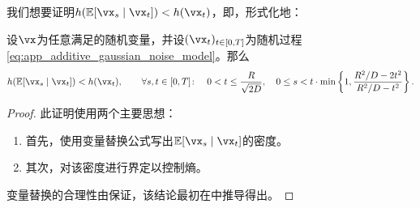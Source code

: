 \documentclass[../../book-main.tex]{subfiles}
\begin{document}
我们想要证明\(h(\Ex[\vx_{s} \mid \vx_{t}]) < h(\vx_{t})\)，即，形式化地：
\begin{theorem}\label{thm:conditioning_reduces_entropy}
    设\(\vx\)为任意满足的随机变量，并设\((\vx_{t})_{t \in [0, T]}\)为随机过程\eqref{eq:app_additive_gaussian_noise_model}。那么
    \begin{equation}
        h(\Ex[\vx_{s} \mid \vx_{t}]) < h(\vx_{t}), \qquad \forall s, t \in [0, T] \colon \quad 0 < t \leq \frac{R}{\sqrt{2D}}, \quad 0 \leq s  < t\cdot\min\bc{1, \frac{R^{2}/D - 2t^{2}}{R^{2}/D - t^{2}}}.
    \end{equation}
\end{theorem}
\begin{proof}
    此证明使用两个主要思想：
    \begin{enumerate}
        \item 首先，使用变量替换公式写出\(\Ex[\vx_{s} \mid \vx_{t}]\)的密度。
        \item 其次，对该密度进行界定以控制熵。
    \end{enumerate}
    变量替换的合理性由保证，该结论最初在\cite{Gribonval2011-pf}中推导得出。


\end{proof}
\end{document}
